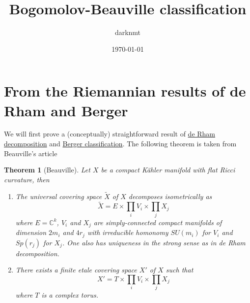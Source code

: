 \documentclass[11pt]{article}
\author{darknmt}
\date{\today}
\title{Bogomolov-Beauville classification}
\newtheorem{theorem}{Theorem}
\begin{document}
\maketitle
\tableofcontents


\section{From the Riemannian results of de Rham and Berger}
\label{sec:orgd5e38c4}

We will first prove a (conceptually) straightforward result of \href{de-rham-decomposition.org}{de Rham decomposition} and
\href{Berger-remark-complex}{Berger classification}. The following theorem is taken from Beauville's article
\begin{theorem}[Beauville]
\label{thm:beauville-1}
\label{org3e8285f}
Let \(X\) be a compact Kähler manifold with flat Ricci curvature, then
\begin{enumerate}
\item The universal covering space \(\tilde X\) of \(X\) decomposes isometrically as \[\tilde X =
   E \times\prod_i V_i\times \prod_j X_j\] where \(E = \mathbb{C}^k\), \(V_i\) and \(X_j\) are simply-connected
compact manifolds of dimension \(2m_i\) and \(4r_j\) with irreducible homonomy \(SU(m_i)\) for \(V_i\) and \(Sp(r_j)\) for \(X_j\). One
also has uniqueness in the strong sense as in de Rham decomposition.
\item There exists a finite etale covering space \(X'\) of \(X\) such that \[ X' = T\times \prod_i V_i
   \times \prod_j X_j\] where \(T\) is a complex torus.
\end{enumerate}
\end{theorem}
\end{document}

